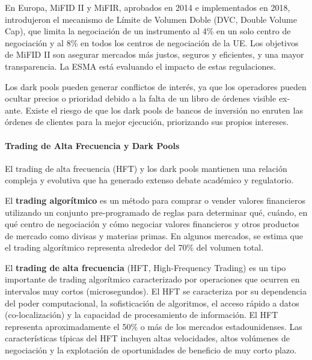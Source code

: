 \begin{proposicion}
En Europa, MiFID II y MiFIR, aprobados en 2014 e implementados en 2018, introdujeron el mecanismo de Límite de Volumen Doble (DVC, Double Volume Cap), que limita la negociación de un instrumento al 4\% en un solo centro de negociación y al 8\% en todos los centros de negociación de la UE. Los objetivos de MiFID II son asegurar mercados más justos, seguros y eficientes, y una mayor transparencia. La ESMA está evaluando el impacto de estas regulaciones.
\end{proposicion}

\begin{proposicion}
Los dark pools pueden generar conflictos de interés, ya que los operadores pueden ocultar precios o prioridad debido a la falta de un libro de órdenes visible ex-ante. Existe el riesgo de que los dark pools de bancos de inversión no enruten las órdenes de clientes para la mejor ejecución, priorizando sus propios intereses.
\end{proposicion}

\paragraph{Trading de Alta Frecuencia y Dark Pools}

El trading de alta frecuencia (HFT) y los dark pools mantienen una relación compleja y evolutiva que ha generado extenso debate académico y regulatorio.

\begin{definicion}
El \textbf{trading algorítmico} es un método para comprar o vender valores financieros utilizando un conjunto pre-programado de reglas para determinar qué, cuándo, en qué centro de negociación y cómo negociar valores financieros y otros productos de mercado como divisas y materias primas. En algunos mercados, se estima que el trading algorítmico representa alrededor del 70\% del volumen total.
\end{definicion}

\begin{definicion}
El \textbf{trading de alta frecuencia} (HFT, High-Frequency Trading) es un tipo importante de trading algorítmico caracterizado por operaciones que ocurren en intervalos muy cortos (microsegundos). El HFT se caracteriza por su dependencia del poder computacional, la sofisticación de algoritmos, el acceso rápido a datos (co-localización) y la capacidad de procesamiento de información. El HFT representa aproximadamente el 50\% o más de los mercados estadounidenses. Las características típicas del HFT incluyen altas velocidades, altos volúmenes de negociación y la explotación de oportunidades de beneficio de muy corto plazo.
\end{definicion}

